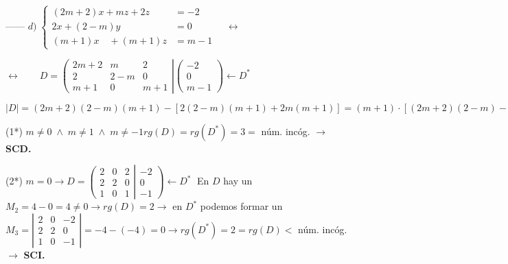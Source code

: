 \begin{proofw}
------ $d)\;  \begin{cases}    (2m+2)x+mz+2z&=-2\\ 2x+(2-m)y&=0\\(m+1)x \quad +(m+1)z&=m-1  \end{cases} \quad \leftrightarrow \qquad $

\noindent $ \leftrightarrow \qquad  D=\left( \begin{matrix}  2m+2&m&2\\2&2-m&0\\m+1&0&m+1
\end{matrix} \right| \left( \begin{matrix} -2\\0\\m-1 \end{matrix} \right) \leftarrow D^*$

\noindent $|D|=(2m+2)(2-m)(m+1)-[2(2-m)(m+1)+2m(m+1)]= (m+1)\cdot [(2m+2)(2-m)-2(2-m)+m]= (m+1)\; [(2m+2)(2-m)-4]=2(m+1)m(1-m) = 0 \leftrightarrow m=0 \; \wedge \; m=1 \; \wedge \; m=-1$

\noindent (1*) $m\neq 0 \; \wedge \; m\neq 1 \; \wedge \; m\neq -1 	rg(D)=rg(D^*)=3=$ núm. incóg. $\to$ \textbf{ SCD.}

\noindent (2*) $m=0 \to  D=\left( \begin{matrix}  \boxed{2}&\boxed{0}&2\\\boxed{2}&\boxed{2}&0\\1&0&1   \end{matrix} \right|
\left. \begin{matrix} -2\\0\\-1   \end{matrix} \right) \leftarrow D^*\;$ En $D$ hay un $\boxed{M_2}=4-0=4\neq 0 \to rg(D)=2 \to $ en $D^*$ podemos formar un $M_3= \left| \begin{matrix} 2&0&-2\\2&2&0\\1&0&-1 \end{matrix} \right|=-4-(-4)=0 \to rg(D^*)=2=rg(D)< $ núm. incóg. $\to $ \textbf{ SCI.} 


\end{proofw}
